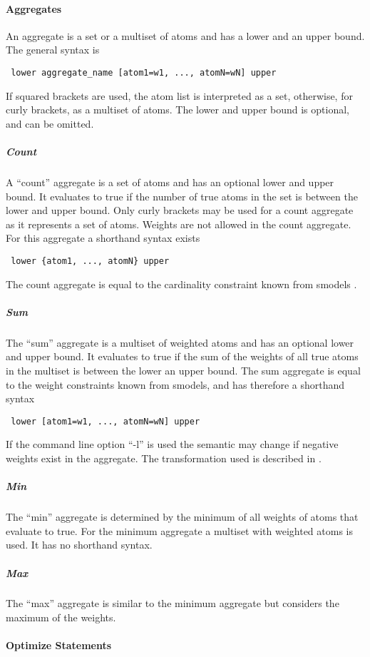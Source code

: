 \documentclass[a4paper,10pt]{article}
\begin{document}
\paragraph{Aggregates}
An aggregate is a set or a multiset of atoms and has a lower and an upper bound.
The general syntax is
\begin{verbatim}
 lower aggregate_name [atom1=w1, ..., atomN=wN] upper
\end{verbatim}
If squared brackets are used, the atom list is interpreted as a set, otherwise, for curly brackets, as a multiset of atoms.
The lower and upper bound is optional, and can be omitted.

\subparagraph{Count}
A ``count'' aggregate is a set of atoms and has an optional lower and upper bound.
It evaluates to true if the number of true atoms in the set is between the lower and upper bound. Only curly brackets may be used for a count aggregate as it represents a set of atoms.
Weights are not allowed in the count aggregate.
For this aggregate a shorthand syntax exists
\begin{verbatim}
 lower {atom1, ..., atomN} upper
\end{verbatim}
The count aggregate is equal to the cardinality constraint known from smodels \cite{smodels}.
\subparagraph{Sum}
The ``sum'' aggregate is a multiset of weighted atoms and has an optional lower and upper bound. It evaluates to true if the sum of the weights of all true atoms in the multiset is between the lower an upper bound.
The sum aggregate is equal to the weight constraints known from smodels, and has therefore a shorthand syntax
\begin{verbatim}
 lower [atom1=w1, ..., atomN=wN] upper
\end{verbatim}
If the command line option ``-l'' is used the semantic may change if negative weights exist in the aggregate. The transformation used is described in \cite{lparseManual}.

\subparagraph{Min}
The ``min'' aggregate is determined by the minimum of all weights of atoms that evaluate to true.
For the minimum aggregate a multiset with weighted atoms is used. It has no shorthand syntax.
\subparagraph{Max}
The ``max'' aggregate is similar to the minimum aggregate but considers the maximum of the weights.

\paragraph{Optimize Statements}
\end{document}
